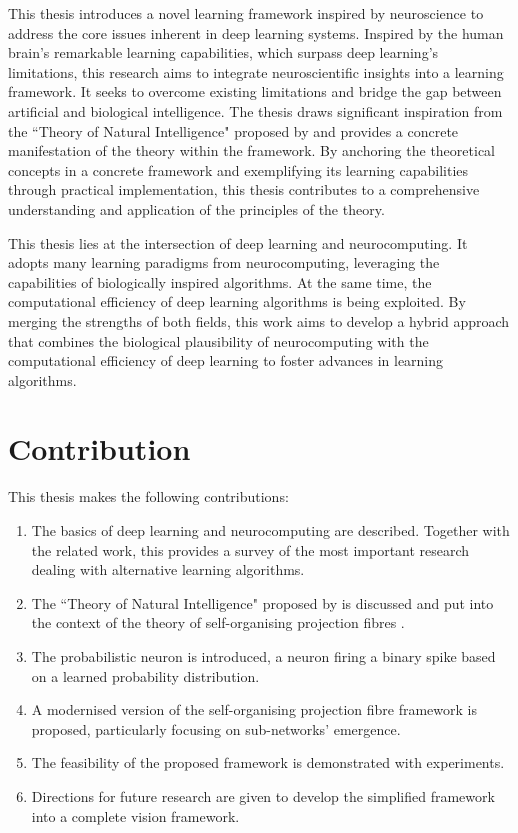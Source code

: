 This thesis introduces a novel learning framework inspired by neuroscience to address the core issues inherent in deep learning systems. Inspired by the human brain's remarkable learning capabilities, which surpass deep learning's limitations, this research aims to integrate neuroscientific insights into a learning framework. It seeks to overcome existing limitations and bridge the gap between artificial and biological intelligence. The thesis draws significant inspiration from the ``Theory of Natural Intelligence" proposed by  and provides a concrete manifestation of the theory within the framework. By anchoring the theoretical concepts in a concrete framework and exemplifying its learning capabilities through practical implementation, this thesis contributes to a comprehensive understanding and application of the principles of the theory.

This thesis lies at the intersection of deep learning and neurocomputing. It adopts many learning paradigms from neurocomputing, leveraging the capabilities of biologically inspired algorithms. At the same time, the computational efficiency of deep learning algorithms is being exploited. By merging the strengths of both fields, this work aims to develop a hybrid approach that combines the biological plausibility of neurocomputing with the computational efficiency of deep learning to foster advances in learning algorithms.


\section{Contribution}
This thesis makes the following contributions:
\begin{enumerate}
	\item The basics of deep learning and neurocomputing are described. Together with the related work, this provides a survey of the most important research dealing with alternative learning algorithms.
	\item The ``Theory of Natural Intelligence" proposed by  is discussed and put into the context of the theory of self-organising projection fibres .
	\item The probabilistic neuron is introduced, a neuron firing a binary spike based on a learned probability distribution.
	\item A modernised version of the self-organising projection fibre framework is proposed, particularly focusing on sub-networks' emergence.
    \item The feasibility of the proposed framework is demonstrated with experiments.
    \item Directions for future research are given to develop the simplified framework into a complete vision framework.
\end{enumerate}


